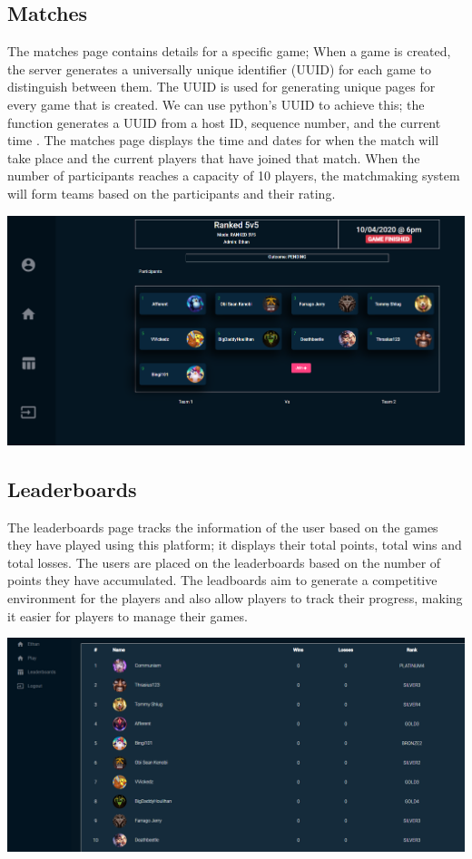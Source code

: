 \subsection{Matches}

The matches page contains details for a specific game; When a game is created, the server generates a universally unique identifier (UUID) for each game to distinguish between them. The UUID is used for generating unique pages for every game that is created. We can use python's UUID to achieve this; the function generates a UUID from a host ID, sequence number, and the current time \cite{pythonuuid}. \hfill \break
The matches page displays the time and dates for when the match will take place and the current players that have joined that match. When the number of participants reaches a capacity of 10 players, the matchmaking system will form teams based on the participants and their rating.
\begin{center}    
	\includegraphics[width=\textwidth,height=\textheight,keepaspectratio]{img/ViewMatch.png}
\end{center}

\newpage
\subsection{Leaderboards}
The leaderboards page tracks the information of the user based on the games they have played using this platform; it displays their total points, total wins and total losses. The users are placed on the leaderboards based on the number of points they have accumulated. The leadboards aim to generate a competitive environment for the players and also allow players to track their progress, making it easier for players to manage their games.
\begin{center}    
	\includegraphics[width=\textwidth,height=\textheight,keepaspectratio]{img/Leaderboards.png}
\end{center}

